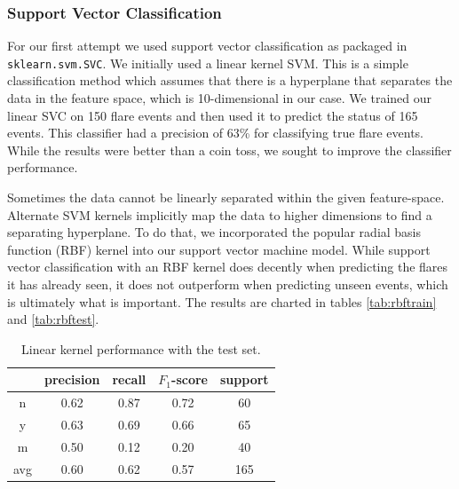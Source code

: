 \documentclass[11pt]{article}
\begin{document}
\subsubsection{Support Vector Classification}
\label{sec:svc}
For our first attempt we used support vector classification as
packaged in \verb|sklearn.svm.SVC|. We initially used a linear kernel
SVM. This is a simple classification method which assumes that there
is a hyperplane that separates the data in the feature space, which is
10-dimensional in our case.  We trained our linear SVC on 150 flare
events and then used it to predict the status of 165 events.  This
classifier had a precision of 63\% for classifying true flare events.
While the results were better than a coin toss, we sought to improve
the classifier performance.

Sometimes the data cannot be linearly separated within the given
feature-space.  Alternate SVM kernels implicitly map the data to
higher dimensions to find a separating hyperplane.  To do that, we
incorporated the popular radial basis function (RBF) kernel into our
support vector machine model.  While support vector classification
with an RBF kernel does decently when predicting the flares it has
already seen, it does not outperform when predicting unseen events,
which is ultimately what is important. The results are charted in
tables \ref{tab:rbftrain} and \ref{tab:rbftest}.

\begin{table}
  \centering
  \begin{tabular}[!htbp]{c|c c c c}
        & precision &recall &$F_1$-score &support \\ \hline
    n   & 0.62      &0.87   &0.72     &60      \\
    y   & 0.63      &0.69   &0.66     &65      \\
    m   & 0.50      &0.12   &0.20     &40      \\ \hline
    avg & 0.60      &0.62   &0.57     &165     \\
  \end{tabular}
  \caption{Linear kernel performance with the test set.}
  \label{tab:lintest}
\end{table}
\end{document}
